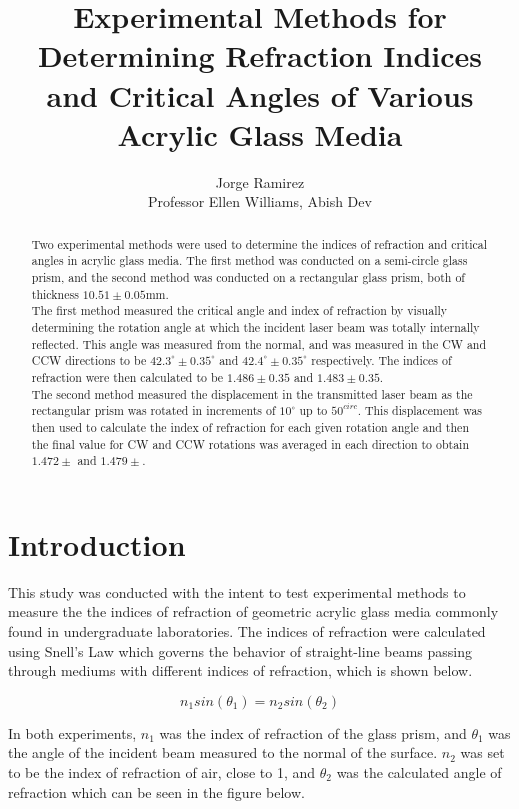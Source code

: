 \documentclass[colorlinks=true,pdfstartview=FitV,linkcolor=blue,
            citecolor=red,urlcolor=magenta]{basedoc}
\title{Experimental Methods for Determining Refraction Indices and Critical Angles of Various Acrylic Glass Media}
\author{Jorge Ramirez \\
Professor Ellen Williams, Abish Dev}
\begin{document}
  \begin{abstract}
    Two experimental methods were used to determine the indices of refraction and critical angles in acrylic glass media. The first method was conducted on a semi-circle glass prism, and the second method was conducted on a rectangular glass prism, both of thickness $10.51 \pm 0.05$mm.
    \\
    \indent The first method measured the critical angle and index of refraction by visually determining the rotation angle at which the incident laser beam was totally internally reflected. This angle was measured from the normal, and was measured in the CW and CCW directions to be $42.3^{\circ} \pm 0.35^{\circ}$ and $42.4^{\circ} \pm 0.35^{\circ}$ respectively. The indices of refraction were then calculated to be $1.486 \pm 0.35$ and $1.483 \pm 0.35$.
    \\
    \indent The second method measured the displacement in the transmitted laser beam as the rectangular prism was rotated in increments of $10^{\circ}$ up to $50^{circ}$. This displacement was then used to calculate the index of refraction for each given rotation angle and then the final value for CW and CCW rotations was averaged in each direction to obtain $1.472 \pm $ and  $1.479 \pm $.

  \end{abstract}

\section{Introduction}
  This study was conducted with the intent to test experimental methods to measure the the indices of refraction of geometric acrylic glass media commonly found in undergraduate laboratories. The indices of refraction were calculated using Snell's Law which governs the behavior of straight-line beams passing through mediums with different indices of refraction, which is shown below.

      \begin{equation} \label{eq:snell}
        n_1 sin(\theta_1) = n_2 sin(\theta_2)
      \end{equation}

  In both experiments, $n_1$ was the index of refraction of the glass prism, and $\theta_1$ was the angle of the incident beam measured to the normal of the surface. $n_2$ was set to be the index of refraction of air, close to 1, and $\theta_2$ was the calculated angle of refraction which can be seen in the figure below.
\end{document}
